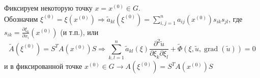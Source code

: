 Фиксируем некоторую точку $x=x^{(0)}\in G$.\\
Обозначим $\displaystyle\xi^{(0)} = \xi(x^{(0)}) \Longrightarrow \tilde a_{kl}(\xi^{(0)}) = \sum^n_{i,j=1}a_{ij}(x^{(0)})s_{ik}s_{jl}$,
где $\displaystyle s_{ik} = \frac{\partial \xi_k}{\partial x_i}(x^{(0)})$ (и т.п.), или
$$ 
\tilde A(\xi^{(0)}) = S^T A(x^{(0)}) S \Longrightarrow \sum^n_{k,l=1}\tilde a_{kl}(\xi)\frac{\partial^2 \tilde u}{\partial \xi_k \partial \xi_l}+
\tilde\Phi(\xi,\tilde u,\operatorname{grad}(\tilde u))=0
$$
и в фиксированной точке $ x^{(0)} \in G \rightarrow A(\xi^{(0)}) = S^TA(x^{(0)})S $




















